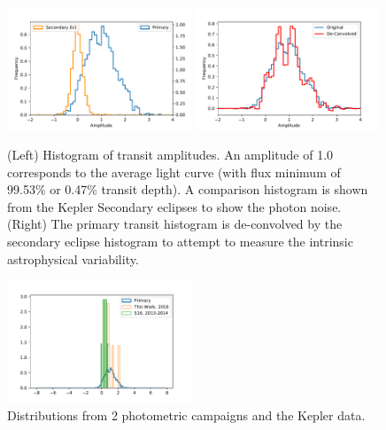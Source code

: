 \documentclass[preprint]{aastex61}
\begin{document}
\begin{figure}[!hbtp]
\begin{centering}
\includegraphics[width=0.49\textwidth]{images/kepler/amplitude_histogram.pdf}
\includegraphics[width=0.49\textwidth]{images/kepler/deconvolved_hist.pdf}
\caption{(Left) Histogram of transit amplitudes.
An amplitude of 1.0 corresponds to the average light curve (with flux minimum of 99.53\% or 0.47\% transit depth).
A comparison histogram is shown from the Kepler Secondary eclipses to show the photon noise.
(Right) The primary transit histogram is de-convolved by the secondary eclipse histogram to attempt to measure the intrinsic astrophysical variability.}\label{fig:histograms}
\end{centering}
\end{figure}


\begin{figure}[!hbtp]
\begin{centering}
\includegraphics[width=0.49\textwidth]{images/kepler/amp_distributions_comparison.pdf}
\caption{Distributions from 2 photometric campaigns and the Kepler data.}\label{fig:histoPhot}
\end{centering}
\end{figure}
\end{document}
